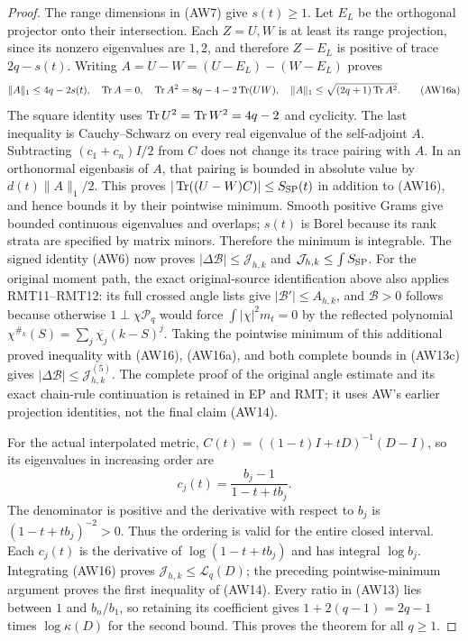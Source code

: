 \begin{proof}
The range dimensions in (AW7) give $s(t)\ge1$. Let $E_L$ be the
orthogonal projector onto their intersection. Each $Z=U,W$ is
at least its range projection, since its nonzero eigenvalues are
$1,2$, and therefore $Z-E_L$ is positive of trace $2q-s(t)$.
Writing $A=U-W=(U-E_L)-(W-E_L)$ proves
\[
 \|A\|_1\le4q-2s(t),\quad
 \operatorname{Tr} A=0,\quad
 \operatorname{Tr} A^2=8q-4-2\operatorname{Tr}(UW),\quad
 \|A\|_1\le\sqrt{(2q+1)\operatorname{Tr} A^2}.
 \tag{AW16a}
\]
The square identity uses $\operatorname{Tr} U^2=\operatorname{Tr} W^2=4q-2$ and cyclicity.
The last inequality is Cauchy--Schwarz on every real eigenvalue of
the self-adjoint $A$. Subtracting $(c_1+c_n)I/2$ from $C$
does not change its trace pairing with $A$. In an orthonormal
eigenbasis of $A$, that pairing is bounded in absolute value by
$d(t)\|A\|_1/2$. This proves
$|\operatorname{Tr}((U-W)C)|\le S_{\rm SP}(t)$ in addition to (AW16),
and hence bounds it by their pointwise minimum. Smooth positive
Grams give bounded continuous eigenvalues and overlaps;
$s(t)$ is Borel because its rank strata are specified by matrix
minors. Therefore the minimum is integrable. The signed identity
(AW6) now proves $|\Delta\mathcal B|\le\mathcal J_{h,k}$ and
$\mathcal J_{h,k}\le\int S_{\rm SP}$.
For the original moment path, the exact original-source identification
above also applies RMT11--RMT12: its full crossed angle lists give
$|\mathcal B'|\le A_{h,k}$, and $\mathcal B>0$ follows because
otherwise $1\perp\chi\mathcal P_q$ would force
$\int|\chi|^2m_t=0$ by the reflected polynomial
$\chi^{\#_k}(S)=\sum_j\overline{\chi_j}(k-S)^j$.
Taking the pointwise minimum of this additional proved inequality
with (AW16), (AW16a), and both complete bounds in (AW13c) gives
$|\Delta\mathcal B|\le\mathcal J_{h,k}^{(5)}$.
The complete proof of the original angle estimate and its exact
chain-rule continuation is retained in EP and RMT; it uses
AW's earlier projection identities, not the final claim (AW14).


For the actual interpolated metric,
$C(t)=((1-t)I+tD)^{-1}(D-I)$, so its eigenvalues in increasing
order are
\[
 c_j(t)=\frac{b_j-1}{1-t+tb_j}.
 \tag{AW17}
\]
The denominator is positive and the derivative with respect
to $b_j$ is $(1-t+tb_j)^{-2}>0$. Thus the ordering is valid
for the entire closed interval. Each $c_j(t)$ is the derivative
of $\log(1-t+tb_j)$ and has integral $\log b_j$.
Integrating (AW16) proves $\mathcal J_{h,k}\le\mathcal L_q(D)$;
the preceding pointwise-minimum argument proves the first inequality
of (AW14). Every ratio in (AW13) lies
between $1$ and $b_n/b_1$, so retaining its coefficient gives
$1+2(q-1)=2q-1$ times $\log\kappa(D)$ for the second bound.
This proves the theorem for all $q\ge1$.
\end{proof}

